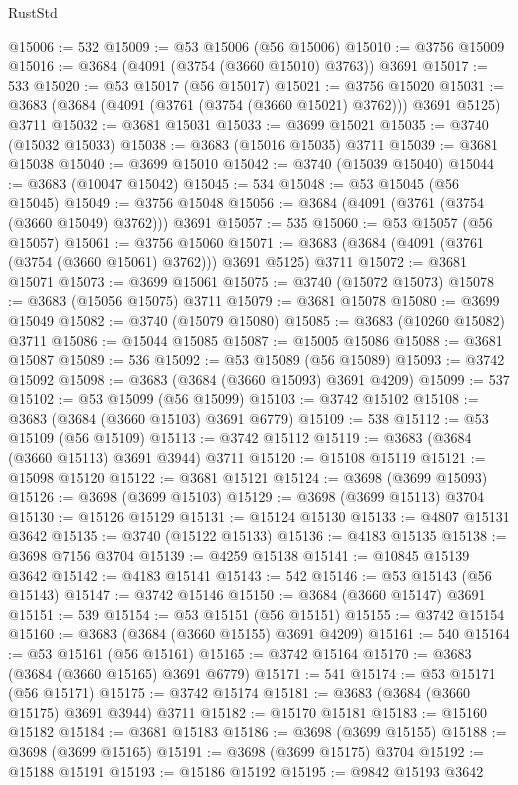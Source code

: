 \begin{lexlean}{RustStd}
\begin{coremodule}
@15006 := 532
@15009 := @53 @15006 (@56 @15006)
@15010 := @3756 @15009
@15016 := @3684 (@4091 (@3754 (@3660 @15010) @3763)) @3691
@15017 := 533
@15020 := @53 @15017 (@56 @15017)
@15021 := @3756 @15020
@15031 := @3683 (@3684 (@4091 (@3761 (@3754 (@3660 @15021) @3762))) @3691 @5125) @3711
@15032 := @3681 @15031
@15033 := @3699 @15021
@15035 := @3740 (@15032 @15033)
@15038 := @3683 (@15016 @15035) @3711
@15039 := @3681 @15038
@15040 := @3699 @15010
@15042 := @3740 (@15039 @15040)
@15044 := @3683 (@10047 @15042)
@15045 := 534
@15048 := @53 @15045 (@56 @15045)
@15049 := @3756 @15048
@15056 := @3684 (@4091 (@3761 (@3754 (@3660 @15049) @3762))) @3691
@15057 := 535
@15060 := @53 @15057 (@56 @15057)
@15061 := @3756 @15060
@15071 := @3683 (@3684 (@4091 (@3761 (@3754 (@3660 @15061) @3762))) @3691 @5125) @3711
@15072 := @3681 @15071
@15073 := @3699 @15061
@15075 := @3740 (@15072 @15073)
@15078 := @3683 (@15056 @15075) @3711
@15079 := @3681 @15078
@15080 := @3699 @15049
@15082 := @3740 (@15079 @15080)
@15085 := @3683 (@10260 @15082) @3711
@15086 := @15044 @15085
@15087 := @15005 @15086
@15088 := @3681 @15087
@15089 := 536
@15092 := @53 @15089 (@56 @15089)
@15093 := @3742 @15092
@15098 := @3683 (@3684 (@3660 @15093) @3691 @4209)
@15099 := 537
@15102 := @53 @15099 (@56 @15099)
@15103 := @3742 @15102
@15108 := @3683 (@3684 (@3660 @15103) @3691 @6779)
@15109 := 538
@15112 := @53 @15109 (@56 @15109)
@15113 := @3742 @15112
@15119 := @3683 (@3684 (@3660 @15113) @3691 @3944) @3711
@15120 := @15108 @15119
@15121 := @15098 @15120
@15122 := @3681 @15121
@15124 := @3698 (@3699 @15093)
@15126 := @3698 (@3699 @15103)
@15129 := @3698 (@3699 @15113) @3704
@15130 := @15126 @15129
@15131 := @15124 @15130
@15133 := @4807 @15131 @3642
@15135 := @3740 (@15122 @15133)
@15136 := @4183 @15135
@15138 := @3698 @7156 @3704
@15139 := @4259 @15138
@15141 := @10845 @15139 @3642
@15142 := @4183 @15141
@15143 := 542
@15146 := @53 @15143 (@56 @15143)
@15147 := @3742 @15146
@15150 := @3684 (@3660 @15147) @3691
@15151 := 539
@15154 := @53 @15151 (@56 @15151)
@15155 := @3742 @15154
@15160 := @3683 (@3684 (@3660 @15155) @3691 @4209)
@15161 := 540
@15164 := @53 @15161 (@56 @15161)
@15165 := @3742 @15164
@15170 := @3683 (@3684 (@3660 @15165) @3691 @6779)
@15171 := 541
@15174 := @53 @15171 (@56 @15171)
@15175 := @3742 @15174
@15181 := @3683 (@3684 (@3660 @15175) @3691 @3944) @3711
@15182 := @15170 @15181
@15183 := @15160 @15182
@15184 := @3681 @15183
@15186 := @3698 (@3699 @15155)
@15188 := @3698 (@3699 @15165)
@15191 := @3698 (@3699 @15175) @3704
@15192 := @15188 @15191
@15193 := @15186 @15192
@15195 := @9842 @15193 @3642

\end{coremodule}
\end{lexlean}
